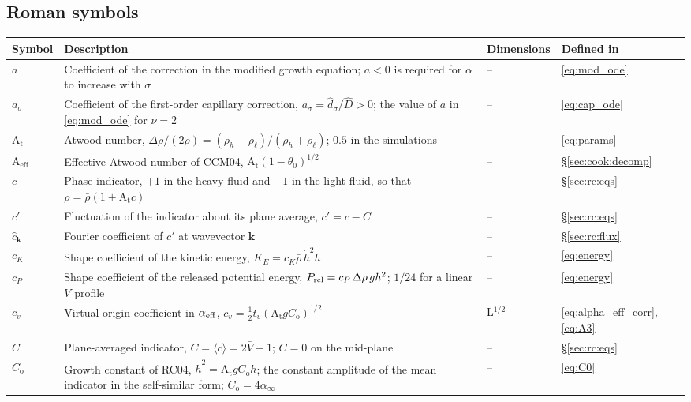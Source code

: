 \documentclass[11pt]{article}
\numberwithin{equation}{section}
\newcommand{\avg}[1]{\langle #1\rangle}
\newcommand{\At}{\mathrm{A_t}}
\newcommand{\hd}{\dot h}
\begin{document}
\subsection*{Roman symbols}
\begin{longtable}{@{}P{0.13}P{0.53}P{0.13}P{0.13}@{}}
\toprule
Symbol & Description & Dimensions & Defined in\\
\midrule
\endhead
\bottomrule
\endfoot
$a$ & Coefficient of the correction in the modified growth equation; $a < 0$ is required for $\alpha$ to increase with $\sigma$ & -- & \eqref{eq:mod_ode}\\
$a_\sigma$ & Coefficient of the first-order capillary correction, $a_\sigma = \hat d_\sigma/\hat D > 0$; the value of $a$ in \eqref{eq:mod_ode} for $\nu = 2$ & -- & \eqref{eq:cap_ode}\\
$\At$ & Atwood number, $\Delta \rho/(2 \bar\rho) = (\rho_h - \rho_\ell)/(\rho_h + \rho_\ell)$; $0.5$ in the simulations & -- & \eqref{eq:params}\\
$\mathrm{A}_\mathrm{eff}$ & Effective Atwood number of CCM04, $\At(1 - \theta_0)^{1/2}$ & -- & \S\ref{sec:cook:decomp}\\
$c$ & Phase indicator, $+1$ in the heavy fluid and $-1$ in the light fluid, so that $\rho = \bar\rho(1 + \At c)$ & -- & \S\ref{sec:rc:eqs}\\
$c'$ & Fluctuation of the indicator about its plane average, $c' = c - C$ & -- & \S\ref{sec:rc:eqs}\\
$\hat c_{\mathbf k}$ & Fourier coefficient of $c'$ at wavevector $\mathbf k$ & -- & \S\ref{sec:rc:flux}\\
$c_K$ & Shape coefficient of the kinetic energy, $K_E = c_K \bar\rho \, \hd^2 h$ & -- & \eqref{eq:energy}\\
$c_P$ & Shape coefficient of the released potential energy, $P_{\rm rel} = c_P \, \Delta \rho \, g h^2$; $1/24$ for a linear $\bar V$ profile & -- & \eqref{eq:energy}\\
$c_v$ & Virtual-origin coefficient in $\alpha_{\rm eff}$, $c_v = \tfrac12 t_v(\At g C_\mathrm{o})^{1/2}$ & L$^{1/2}$ & \eqref{eq:alpha_eff_corr}, \eqref{eq:A3}\\
$C$ & Plane-averaged indicator, $C = \avg c = 2 \bar V - 1$; $C = 0$ on the mid-plane & -- & \S\ref{sec:rc:eqs}\\
$C_\mathrm{o}$ & Growth constant of RC04, $\hd^2 = \At g C_\mathrm{o} h$; the constant amplitude of the mean indicator in the self-similar form; $C_\mathrm{o} = 4 \alpha_\infty$ & -- & \eqref{eq:C0}\\

\end{longtable}
\end{document}
